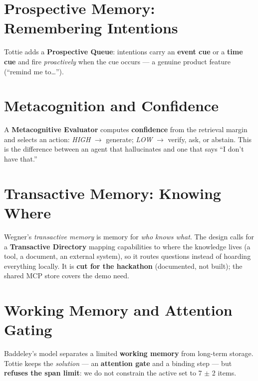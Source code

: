 \section{Prospective Memory: Remembering Intentions}
Tottie adds a \textbf{Prospective Queue}: intentions carry an \textbf{event cue} or a \textbf{time
cue} and fire \emph{proactively} when the cue occurs --- a genuine product feature (``remind me
to\ldots'').

\section{Metacognition and Confidence}
A \textbf{Metacognitive Evaluator} computes \textbf{confidence} from the retrieval margin and selects
an action: \emph{HIGH} $\rightarrow$ generate; \emph{LOW} $\rightarrow$ verify, ask, or abstain. This
is the difference between an agent that hallucinates and one that says ``I don't have that.''

\section{Transactive Memory: Knowing Where}
Wegner's \emph{transactive memory} is memory for \emph{who knows what}. The design calls for a
\textbf{Transactive Directory} mapping capabilities to where the knowledge lives (a tool, a document,
an external system), so it routes questions instead of hoarding everything locally. It is
\textbf{cut for the hackathon} (documented, not built); the shared MCP store covers the demo need.

\section{Working Memory and Attention Gating}
Baddeley's model separates a limited \textbf{working memory} from long-term storage. Tottie keeps the
\emph{solution} --- an \textbf{attention gate} and a binding step --- but \textbf{refuses the span
limit}: we do not constrain the active set to 7 $\pm$ 2 items.

